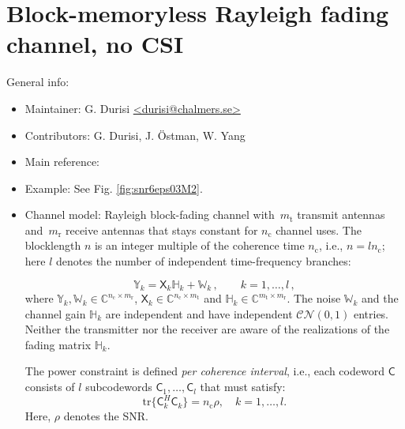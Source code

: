 \documentclass[a4paper,11p]{memoir}
\def\txant{m_{\mathrm{t}}} %
\def\rxant{m_{\mathrm{r}}} %
\def\cohtime{n_{\mathrm{c}}} %
\def\bl{n} %
\def\snr{\rho} %
\def\tfdiv{l}  %
\def\tr{\mathrm{tr}}
\begin{document}
\chapter[Block-memoryless Rayleigh fading (no CSI)]{Block-memoryless Rayleigh fading channel, no CSI}

General info:
\begin{itemize}
  \item Maintainer: G. Durisi \url{<durisi@chalmers.se>}
  
  \item Contributors: G. Durisi, J. \"Ostman, W. Yang

  \item Main reference: \cite{durisi14-12a} 

  \item Example: See Fig. \ref{fig:snr6eps03M2}.
  
  \item Channel model: Rayleigh block-fading channel with~$\txant$ 
  transmit antennas and~$\rxant$ receive antennas that stays constant for
   $\cohtime$ channel uses.
  The blocklength $\bl$ is an integer multiple of the coherence time $\cohtime$, i.e., $\bl=\tfdiv\cohtime$; here
  $\tfdiv$ denotes the number of independent time-frequency branches:
  
  \begin{equation}\label{eq:bfmimo}
  	\mathbb{Y}_k = \mathsf{X}_k \mathbb{H}_k + \mathbb{W}_k\,, \qquad k=1,\ldots, \tfdiv\,,
\end{equation}  
  where $\mathbb{Y}_k, \mathbb{W}_k \in \mathbb{C}^{\cohtime \times \rxant}$, $\mathsf{X}_k \in \mathbb{C}^{\cohtime \times
  \txant}$ and $\mathbb{H}_k\in\mathbb{C}^{\txant \times \rxant}$. The noise $\mathbb{W}_k$ and the channel gain
  $\mathbb{H}_k$ are independent and have independent $\mathcal{CN}(0,1)$ entries.
  Neither the transmitter nor the receiver are aware of the realizations of the fading matrix $\mathbb{H}_k$.


  The power constraint is defined \textit{per coherence interval}, i.e., each codeword $\mathsf{C}$  consists of $\tfdiv$ subcodewords $\mathsf{C}_1,\ldots, \mathsf{C}_\tfdiv$ that must
  satisfy:
    \begin{equation*}
      \tr\bigl\{\mathsf{C}_{k}^H \mathsf{C}_{k}\bigr\}= \cohtime\snr,\quad  k=1,\dots,\tfdiv. 
    \end{equation*}
    Here, $\snr$ denotes the SNR. 


\end{itemize}
\end{document}
